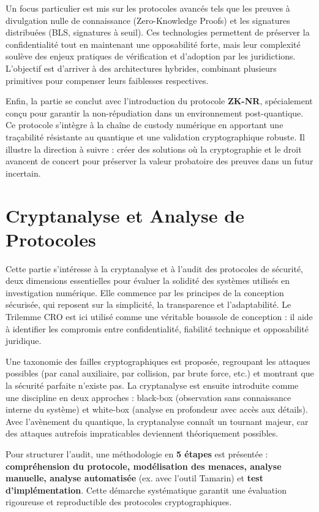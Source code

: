 \documentclass[memoire, 12pt]{report}
\begin{document}
Un focus particulier est mis sur les protocoles avancés tels que les preuves à divulgation nulle de connaissance (Zero-Knowledge Proofs) et les signatures distribuées (BLS, signatures à seuil). Ces technologies permettent de préserver la confidentialité tout en maintenant une opposabilité forte, mais leur complexité soulève des enjeux pratiques de vérification et d’adoption par les juridictions. L’objectif est d’arriver à des architectures hybrides, combinant plusieurs primitives pour compenser leurs faiblesses respectives.

Enfin, la partie se conclut avec l’introduction du protocole \textbf{ZK-NR}, spécialement conçu pour garantir la non-répudiation dans un environnement post-quantique. Ce protocole s’intègre à la chaîne de custody numérique en apportant une traçabilité résistante au quantique et une validation cryptographique robuste. Il illustre la direction à suivre : créer des solutions où la cryptographie et le droit avancent de concert pour préserver la valeur probatoire des preuves dans un futur incertain.

\section*{Cryptanalyse et Analyse de Protocoles}
Cette partie s’intéresse à la cryptanalyse et à l’audit des protocoles de sécurité, deux dimensions essentielles pour évaluer la solidité des systèmes utilisés en investigation numérique. Elle commence par les principes de la conception sécurisée, qui reposent sur la simplicité, la transparence et l’adaptabilité. Le Trilemme CRO est ici utilisé comme une véritable boussole de conception : il aide à identifier les compromis entre confidentialité, fiabilité technique et opposabilité juridique.

Une taxonomie des failles cryptographiques est proposée, regroupant les attaques possibles (par canal auxiliaire, par collision, par brute force, etc.) et montrant que la sécurité parfaite n’existe pas. La cryptanalyse est ensuite introduite comme une discipline en deux approches : black-box (observation sans connaissance interne du système) et white-box (analyse en profondeur avec accès aux détails). Avec l’avènement du quantique, la cryptanalyse connaît un tournant majeur, car des attaques autrefois impraticables deviennent théoriquement possibles.

Pour structurer l’audit, une méthodologie en \textbf{5 étapes} est présentée : \textbf{compréhension du protocole, modélisation des menaces, analyse manuelle, analyse automatisée} (ex. avec l’outil Tamarin) et \textbf{test d’implémentation}. Cette démarche systématique garantit une évaluation rigoureuse et reproductible des protocoles cryptographiques.
\end{document}
